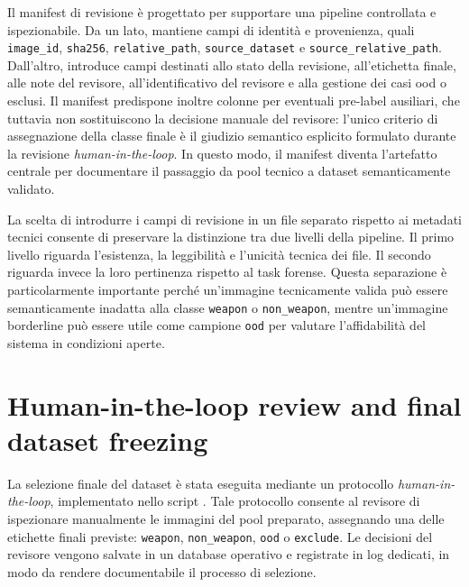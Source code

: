 Il manifest di revisione è progettato per supportare una pipeline controllata e
ispezionabile. Da un lato, mantiene campi di identità e provenienza, quali
\texttt{image\_id}, \texttt{sha256}, \texttt{relative\_path},
\texttt{source\_dataset} e \texttt{source\_relative\_path}. Dall'altro,
introduce campi destinati allo stato della revisione, all'etichetta finale, alle
note del revisore, all'identificativo del revisore e alla gestione dei casi
\gls{ood} o esclusi. Il manifest predispone inoltre colonne per eventuali
pre-label ausiliari, che tuttavia non sostituiscono la decisione manuale del
revisore: l'unico criterio di assegnazione della classe finale è il giudizio
semantico esplicito formulato durante la revisione \textit{human-in-the-loop}.
In questo modo, il manifest diventa l'artefatto centrale per documentare il
passaggio da pool tecnico a dataset semanticamente validato.

La scelta di introdurre i campi di revisione in un file separato rispetto ai
metadati tecnici consente di preservare la distinzione tra due livelli della
pipeline. Il primo livello riguarda l'esistenza, la leggibilità e l'unicità
tecnica dei file. Il secondo riguarda invece la loro pertinenza rispetto al task
forense. Questa separazione è particolarmente importante perché un'immagine
tecnicamente valida può essere semanticamente inadatta alla classe \texttt{weapon}
o \texttt{non\_weapon}, mentre un'immagine borderline può essere utile come
campione \texttt{ood} per valutare l'affidabilità del sistema in condizioni
aperte.


\section{Human-in-the-loop review and final dataset freezing}
\label{sec:methodology-human-review}

La selezione finale del dataset è stata eseguita mediante un protocollo
\textit{human-in-the-loop}, implementato nello script
.
Tale protocollo consente al revisore di ispezionare manualmente le immagini del
pool preparato, assegnando una delle etichette finali previste: \texttt{weapon},
\texttt{non\_weapon}, \texttt{ood} o \texttt{exclude}. Le decisioni del
revisore vengono salvate in un database operativo e registrate in log dedicati,
in modo da rendere documentabile il processo di selezione.

